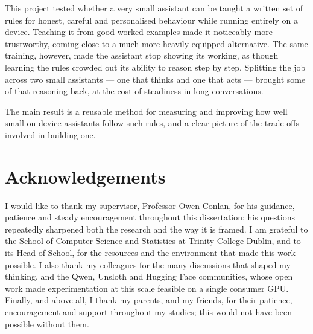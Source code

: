 \documentclass[a4paper,oneside,12pt]{book}
\newcommand{\supervisor}{Professor Owen Conlan} %
\numberwithin{equation}{chapter} %
\numberwithin{algorithm}{chapter} %
\begin{document}
This project tested whether a very small assistant can be taught a written set of rules for honest, careful and personalised behaviour while running entirely on a device. Teaching it from good worked examples made it noticeably more trustworthy, coming close to a much more heavily equipped alternative. The same training, however, made the assistant stop showing its working, as though learning the rules crowded out its ability to reason step by step. Splitting the job across two small assistants --- one that thinks and one that acts --- brought some of that reasoning back, at the cost of steadiness in long conversations.

The main result is a reusable method for measuring and improving how well small on-device assistants follow such rules, and a clear picture of the trade-offs involved in building one.

\newpage
\onehalfspacing\raggedright %

\section*{\Huge\textcolor{tcd_blue}{Acknowledgements}}
I would like to thank my supervisor, Professor Owen Conlan, for his guidance, patience and steady encouragement throughout this dissertation; his questions repeatedly sharpened both the research and the way it is framed. I am grateful to the School of Computer Science and Statistics at Trinity College Dublin, and to its Head of School, for the resources and the environment that made this work possible. I also thank my colleagues for the many discussions that shaped my thinking, and the Qwen, Unsloth and Hugging Face communities, whose open work made experimentation at this scale feasible on a single consumer GPU. Finally, and above all, I thank my parents, and my friends, for their patience, encouragement and support throughout my studies; this would not have been possible without them.
\tableofcontents
\listoffigures
\listoftables
\newpage
\end{document}
